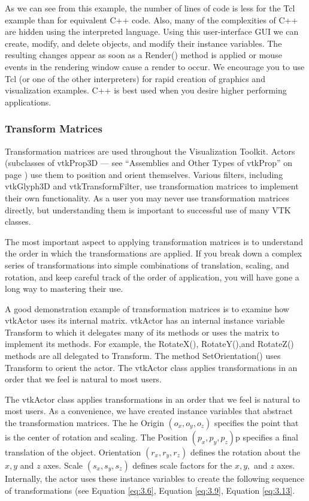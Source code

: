 As we can see from this example, the number of lines of code is less for the Tcl example than for equivalent C++ code. Also, many of the complexities of C++ are hidden using the interpreted language. Using this user-interface GUI we can create, modify, and delete objects, and modify their instance variables. The resulting changes appear as soon as a Render() method is applied or mouse events in the rendering window cause a render to occur. We encourage you to use Tcl (or one of the other interpreters) for rapid creation of graphics and visualization examples. C++ is best used when you desire higher performing applications.

\subsubsection{Transform Matrices}
\label{subsec:transform_matrices}

Transformation matrices are used throughout the  Visualization Toolkit. Actors (subclasses of vtkProp3D --- see ``Assemblies and Other Types of vtkProp'' on page \pageref{subsec:assemblies_vtkprop} ) use them to position and orient themselves. Various filters, including vtkGlyph3D and vtkTransformFilter, use transformation matrices to implement their own functionality. As a user you may never use transformation matrices directly, but understanding them is important to successful use of many VTK classes.

The most important aspect to applying transformation matrices is to understand the order in which the transformations are applied. If you break down a complex series of transformations into simple combinations of translation, scaling, and rotation, and keep careful track of the order of application, you will have gone a long way to mastering their use.

A good demonstration example of transformation matrices is to examine how vtkActor uses its internal matrix. vtkActor has an internal instance variable Transform to which it delegates many of its methods or uses the matrix to implement its methods. For example, the RotateX(), RotateY(),and RotateZ() methods are all delegated to Transform. The method SetOrientation() uses Transform to orient the actor. The vtkActor class applies transformations in an order that we feel is natural to most users.

The vtkActor class applies transformations in an order that we feel is natural to most users. As a convenience, we have created instance variables that abstract the transformation matrices. The he Origin $(o_x,o_y,o_z)$ specifies the point that is the center of rotation and scaling. The Position $(p_x, p_y, p_z)$p specifies a final translation of the object. Orientation $(r_x, r_y, r_z)$ defines the rotation about the $x, y$ and $z$ axes. Scale $(s_x, s_y, s_z)$ defines scale factors for the $x, y,$ and $z$ axes. Internally, the actor uses these instance variables to create the following sequence of transformations (see Equation \eqref{eq:3.6}, Equation \eqref{eq:3.9},  Equation \eqref{eq:3.13}.

